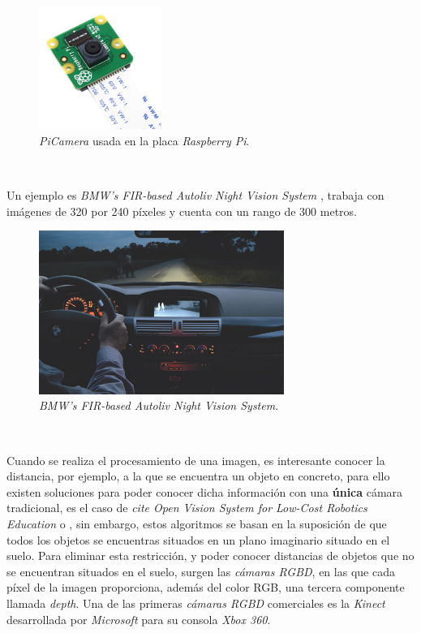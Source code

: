 \begin{figure} [h!]
	\begin{center}
		\includegraphics[width=4cm]{figs/picamera}
	\end{center}
	\caption{\textit{PiCamera} usada en la placa \textit{Raspberry Pi}.}
	\label{fig:picamera}
\end{figure}\

Un ejemplo es \textit{BMW's FIR-based Autoliv Night Vision System} \cite{nightvision}, trabaja con imágenes de 320 por 240 píxeles y cuenta con un rango de 300 metros.\\

\begin{figure} [h!]
	\begin{center}
		\includegraphics[width=8cm]{figs/nightvision}
	\end{center}
	\caption{\textit{BMW's FIR-based Autoliv Night Vision System}.}
	\label{fig:nightvision}
\end{figure}\

Cuando se realiza el procesamiento de una imagen, es interesante conocer la distancia, por ejemplo, a la que se encuentra un objeto en concreto, para ello existen soluciones para poder conocer dicha información con una \textbf{única} cámara tradicional, es el caso de \textit{cite Open Vision System for Low-Cost Robotics Education} o \cite{distanceopencv}, sin embargo, estos algoritmos se basan en la suposición de que todos los objetos se encuentras situados en un plano imaginario situado en el suelo. Para eliminar esta restricción, y poder conocer distancias de objetos que no se encuentran situados en el suelo, surgen las \textit{cámaras RGBD}, en las que cada píxel de la imagen proporciona, además del color RGB, una tercera componente llamada \textit{depth}. Una de las primeras \textit{cámaras RGBD} comerciales es la \textit{Kinect} desarrollada por \textit{Microsoft} para su consola \textit{Xbox 360}.\\

